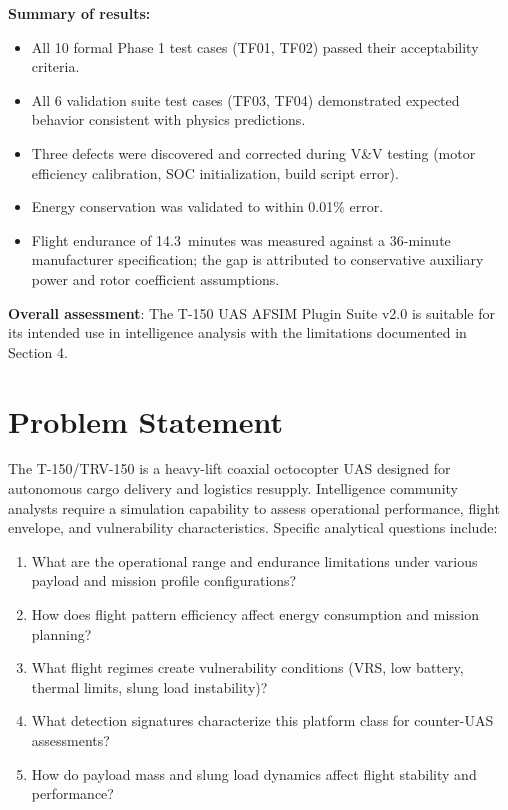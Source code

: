 \documentclass[11pt, letterpaper]{article}
\begin{document}
\unclass \textbf{Summary of results:}
\begin{itemize}
    \item \unclass All 10 formal Phase 1 test cases (TF01, TF02) passed their acceptability criteria.
    \item \unclass All 6 validation suite test cases (TF03, TF04) demonstrated expected behavior consistent with physics predictions.
    \item \unclass Three defects were discovered and corrected during V\&V testing (motor efficiency calibration, SOC initialization, build script error).
    \item \unclass Energy conservation was validated to within 0.01\% error.
    \item \unclass Flight endurance of 14.3~minutes was measured against a 36-minute manufacturer specification; the gap is attributed to conservative auxiliary power and rotor coefficient assumptions.
\end{itemize}

\unclass \textbf{Overall assessment}: The T-150 UAS AFSIM Plugin Suite v2.0 is suitable for its intended use in intelligence analysis with the limitations documented in Section 4.

\pagebreak


\section{\unclass Problem Statement}

\unclass The T-150/TRV-150 is a heavy-lift coaxial octocopter UAS designed for autonomous cargo delivery and logistics resupply. Intelligence community analysts require a simulation capability to assess operational performance, flight envelope, and vulnerability characteristics. Specific analytical questions include:

\begin{enumerate}
    \item \unclass What are the operational range and endurance limitations under various payload and mission profile configurations?
    \item \unclass How does flight pattern efficiency affect energy consumption and mission planning?
    \item \unclass What flight regimes create vulnerability conditions (VRS, low battery, thermal limits, slung load instability)?
    \item \unclass What detection signatures characterize this platform class for counter-UAS assessments?
    \item \unclass How do payload mass and slung load dynamics affect flight stability and performance?
\end{enumerate}
\end{document}
